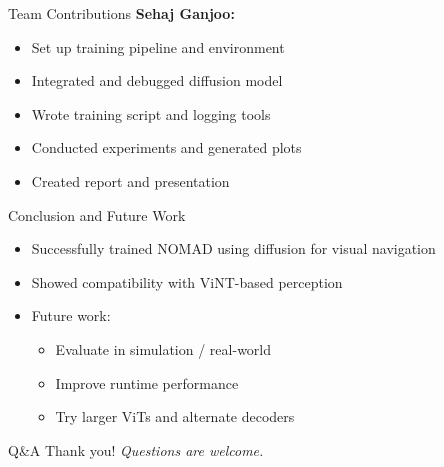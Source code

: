 \documentclass{beamer}
\begin{document}
\begin{frame}{Team Contributions}
\textbf{Sehaj Ganjoo:}
\begin{itemize}
    \item Set up training pipeline and environment
    \item Integrated and debugged diffusion model
    \item Wrote training script and logging tools
    \item Conducted experiments and generated plots
    \item Created report and presentation
\end{itemize}
\end{frame}

\begin{frame}{Conclusion and Future Work}
\begin{itemize}
    \item Successfully trained NOMAD using diffusion for visual navigation
    \item Showed compatibility with ViNT-based perception
    \item Future work:
    \begin{itemize}
        \item Evaluate in simulation / real-world
        \item Improve runtime performance
        \item Try larger ViTs and alternate decoders
    \end{itemize}
\end{itemize}
\end{frame}

\begin{frame}{Q\&A}
Thank you! \newline
\textit{Questions are welcome.}
\end{frame}
\end{document}
